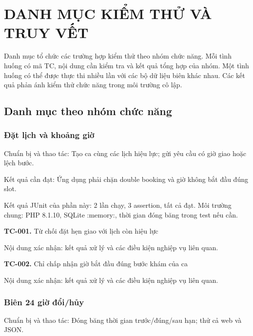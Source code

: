 \chapter{DANH MỤC KIỂM THỬ VÀ TRUY VẾT}\label{app:tests}
Danh mục tổ chức các trường hợp kiểm thử theo nhóm chức năng.\allowbreak{} Mỗi tình huống có mã TC, nội dung cần kiểm tra và kết quả tổng hợp của nhóm.\allowbreak{} Một tình huống có thể được thực thi nhiều lần với các bộ dữ liệu biên khác nhau.\allowbreak{} Các kết quả phản ánh kiểm thử chức năng trong môi trường cô lập.\allowbreak{}


\section{Danh mục theo nhóm chức năng}
\begingroup\fontsize{11.5}{14.5}\selectfont

\par\vspace{8pt}

\subsection{Đặt lịch và khoảng giờ}
Chuẩn bị và thao tác:\allowbreak{} Tạo ca cùng các lịch hiệu lực; gửi yêu cầu có giờ giao hoặc lệch bước.\allowbreak{}

Kết quả cần đạt:\allowbreak{} Ứng dụng phải chặn double booking và giờ không bắt đầu đúng slot.\allowbreak{}

Kết quả JUnit của phần này:\allowbreak{} 2 lần chạy, 3 assertion, tất cả đạt.\allowbreak{} Môi trường chung:\allowbreak{} PHP 8.\allowbreak{}1.\allowbreak{}10, SQLite :\allowbreak{}memory:\allowbreak{}, thời gian đóng băng trong test nếu cần.\allowbreak{}

\noindent\textbf{TC-001.} Từ chối đặt hẹn giao với lịch còn hiệu lực\par
Nội dung xác nhận:\allowbreak{} kết quả xử lý và các điều kiện nghiệp vụ liên quan.\allowbreak{}

\noindent\textbf{TC-002.} Chỉ chấp nhận giờ bắt đầu đúng bước khám của ca\par
Nội dung xác nhận:\allowbreak{} kết quả xử lý và các điều kiện nghiệp vụ liên quan.\allowbreak{}


\par\vspace{8pt}

\subsection{Biên 24 giờ đổi/\allowbreak{}hủy}
Chuẩn bị và thao tác:\allowbreak{} Đóng băng thời gian trước/\allowbreak{}đúng/\allowbreak{}sau hạn; thử cả web và JSON.\allowbreak{}

